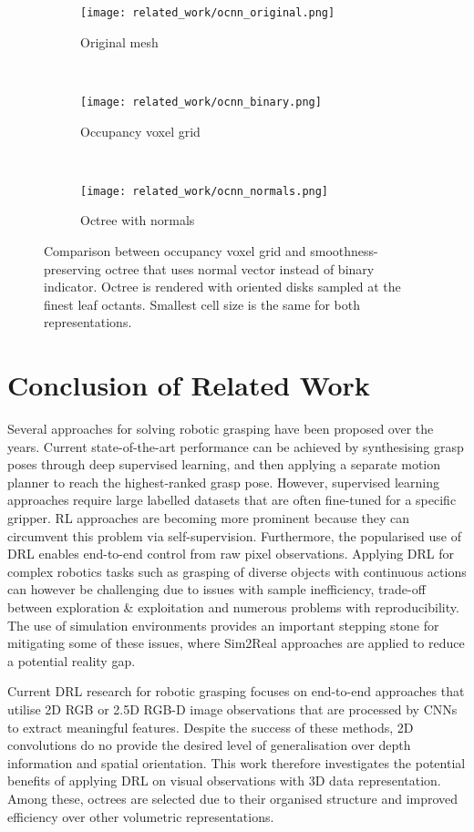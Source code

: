 \begin{figure}[ht]
    \centering
    \begin{subfigure}[ht]{0.325\textwidth}
        \centering
        \texttt{[image: related\_work/ocnn\_original.png]}
        \caption*{Original mesh}
    \end{subfigure}%
    ~
    \begin{subfigure}[ht]{0.325\textwidth}
        \centering
        \texttt{[image: related\_work/ocnn\_binary.png]}
        \caption*{Occupancy voxel grid}
    \end{subfigure}%
    ~
    \begin{subfigure}[ht]{0.325\textwidth}
        \centering
        \texttt{[image: related\_work/ocnn\_normals.png]}
        \caption*{Octree with normals}
    \end{subfigure}%
    \caption{Comparison between occupancy voxel grid and smoothness-preserving octree that uses normal vector instead of binary indicator. Octree is rendered with oriented disks sampled at the finest leaf octants. Smallest cell size is the same for both representations.~\protect\cite{wang_o-cnn_2017}}
    \label{fig:rw_ocnn_occupancy_vs_normals}
\end{figure}


\section*{Conclusion of Related Work}

Several approaches for solving robotic grasping have been proposed over the years. Current state-of-the-art performance can be achieved by synthesising grasp poses through deep supervised learning, and then applying a separate motion planner to reach the highest-ranked grasp pose. However, supervised learning approaches require large labelled datasets that are often fine-tuned for a specific gripper. RL approaches are becoming more prominent because they can circumvent this problem via self-supervision. Furthermore, the popularised use of DRL enables end-to-end control from raw pixel observations. Applying DRL for complex robotics tasks such as grasping of diverse objects with continuous actions can however be challenging due to issues with sample inefficiency, trade-off between exploration \& exploitation and numerous problems with reproducibility. The use of simulation environments provides an important stepping stone for mitigating some of these issues, where Sim2Real approaches are applied to reduce a potential reality gap.

Current DRL research for robotic grasping focuses on end-to-end approaches that utilise 2D RGB or 2.5D RGB-D image observations that are processed by CNNs to extract meaningful features. Despite the success of these methods, 2D convolutions do no provide the desired level of generalisation over depth information and spatial orientation. This work therefore investigates the potential benefits of applying DRL on visual observations with 3D data representation. Among these, octrees are selected due to their organised structure and improved efficiency over other volumetric representations.
